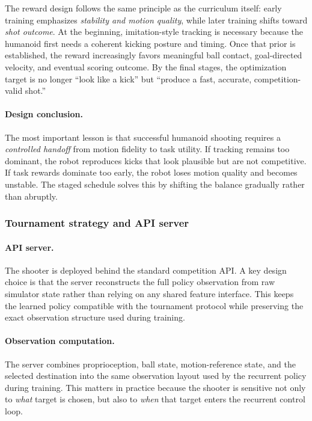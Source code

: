 \documentclass{article}
\begin{document}
The reward design follows the same principle as the curriculum itself: early
training emphasizes \emph{stability and motion quality}, while later training
shifts toward \emph{shot outcome}. At the beginning, imitation-style tracking is
necessary because the humanoid first needs a coherent kicking posture and
timing. Once that prior is established, the reward increasingly favors
meaningful ball contact, goal-directed velocity, and eventual scoring outcome.
By the final stages, the optimization target is no longer ``look like a kick''
but ``produce a fast, accurate, competition-valid shot.''

\paragraph{Design conclusion.} The most important lesson is that successful
humanoid shooting requires a \emph{controlled handoff} from motion fidelity to
task utility. If tracking remains too dominant, the robot reproduces kicks that
look plausible but are not competitive. If task rewards dominate too early, the
robot loses motion quality and becomes unstable. The staged schedule solves this
by shifting the balance gradually rather than abruptly.

\subsubsection{Tournament strategy and API server}\label{sec:sh-phase2}

\paragraph{API server.} The shooter is deployed behind the standard
competition API. A key design choice is that the server reconstructs the full
policy observation from raw simulator state rather than relying on any shared
feature interface. This keeps the learned policy compatible with the tournament
protocol while preserving the exact observation structure used during training.

\paragraph{Observation computation.} The server combines proprioception, ball
state, motion-reference state, and the selected destination into the same
observation layout used by the recurrent policy during training. This matters in
practice because the shooter is sensitive not only to \emph{what} target is
chosen, but also to \emph{when} that target enters the recurrent control loop.
\end{document}
